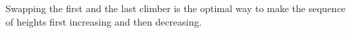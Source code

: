 \nextsample

Swapping the first and the last climber is the optimal way
to make the sequence of heights first increasing and then decreasing.